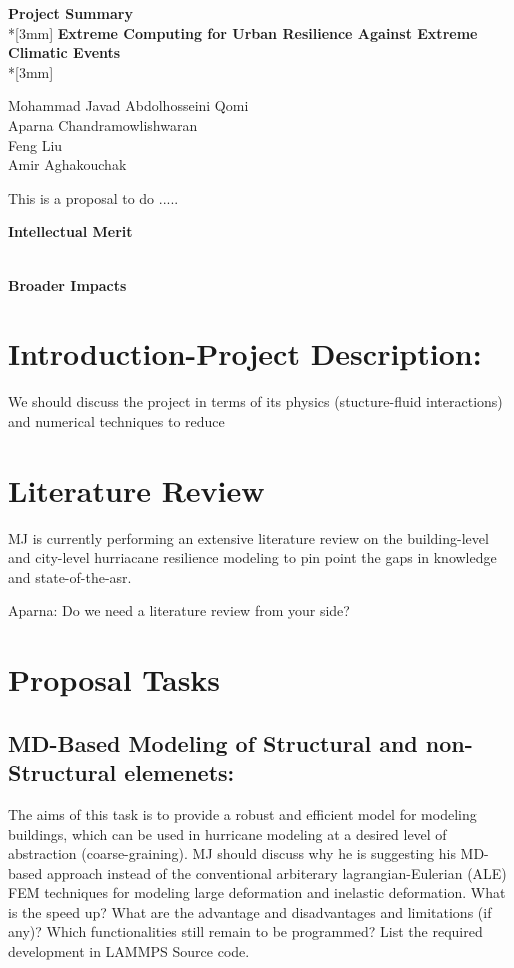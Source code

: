 \documentclass{proposalnsf}
\begin{document}
\begin{center}
{\Large{\bf Project Summary}}\\*[3mm]
{\bf Extreme Computing for Urban Resilience Against Extreme Climatic Events} \\*[3mm]

Mohammad Javad Abdolhosseini Qomi \\
Aparna Chandramowlishwaran \\
Feng Liu \\
Amir Aghakouchak \\

\end{center}


This is a  proposal to do .....



\noindent
{\bf Intellectual Merit}

\ \\

\noindent
{\bf Broader Impacts}

\renewcommand{\thepage} {B--\arabic{page}}

\newpage
\section{Introduction-Project Description:}
We should discuss the project in terms of its physics (stucture-fluid interactions) and numerical techniques to reduce

\section{Literature Review}
MJ is currently performing an extensive literature review on the building-level and city-level hurriacane resilience modeling to pin point the gaps in knowledge and state-of-the-asr.

Aparna: Do we need  a literature review from your side?

\section{Proposal Tasks}

\subsection{MD-Based Modeling of Structural and non-Structural elemenets:} The aims of this task is to provide a robust and efficient model for modeling buildings, which can be used in hurricane modeling at a desired level of abstraction (coarse-graining). MJ should discuss why he is suggesting his MD-based approach instead of the conventional arbiterary lagrangian-Eulerian (ALE) FEM techniques for modeling large deformation and inelastic deformation. What is the speed up? What are the advantage and disadvantages and limitations (if any)? Which functionalities still remain to be programmed? List the required development in LAMMPS Source code. 
\end{document}
